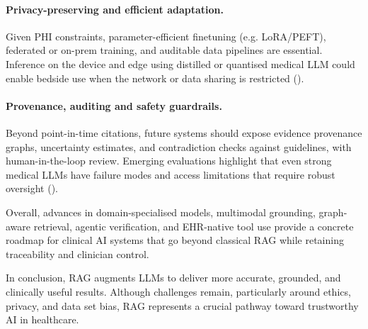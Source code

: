 \paragraph{Privacy-preserving and efficient adaptation.}
Given PHI constraints, parameter-efficient finetuning (e.g. LoRA/PEFT), federated or on-prem training, and auditable data pipelines are essential. Inference on the device and edge using distilled or quantised medical LLM could enable bedside use when the network or data sharing is restricted (\citep{chen2023meditron}).

\paragraph{Provenance, auditing and safety guardrails.}
Beyond point-in-time citations, future systems should expose evidence provenance graphs, uncertainty estimates, and contradiction checks against guidelines, with human-in-the-loop review. Emerging evaluations highlight that even strong medical LLMs have failure modes and access limitations that require robust oversight (\citep{nature2024evallimits}).

Overall, advances in domain-specialised models, multimodal grounding, graph-aware retrieval, agentic verification, and EHR-native tool use provide a concrete roadmap for clinical AI systems that go beyond classical RAG while retaining traceability and clinician control.

In conclusion, RAG augments LLMs to deliver more accurate, grounded, and clinically useful results. Although challenges remain, particularly around ethics, privacy, and data set bias, RAG represents a crucial pathway toward trustworthy AI in healthcare.
